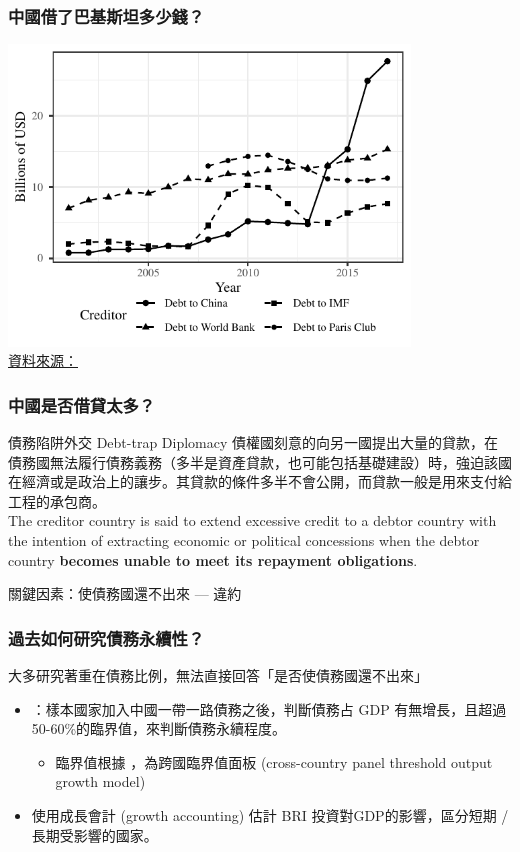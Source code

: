 \documentclass[mathserif]{beamer}
\begin{document}
    \begin{frame}[label = {pak_ts}]
        \frametitle{中國借了巴基斯坦多少錢？}
        \begin{center}
            \includegraphics[width = 0.8\textwidth]{fig/ALL/Pakistan_debt_source.pdf}\\
            \small \hyperlink{pak_ds}{資料來源：}\citet*{Horn-Reinhart-Trebesch-21}
        \end{center}
    \end{frame}

    \begin{frame}
        \frametitle{中國是否借貸太多？}
            \begin{block}{債務陷阱外交 Debt-trap Diplomacy}
               債權國刻意的向另一國提出大量的貸款，在債務國無法履行債務義務（多半是資產貸款，也可能包括基礎建設）時，強迫該國在經濟或是政治上的讓步。其貸款的條件多半不會公開，而貸款一般是用來支付給工程的承包商。\\
               The creditor country is said to extend excessive credit to a debtor country with the intention of extracting economic or political concessions when the debtor country \textbf{becomes unable to meet its repayment obligations}.
            \end{block}
            \pause
            \vfill
            關鍵因素：使債務國還不出來 --- 違約
    \end{frame}

    \begin{frame}
        \frametitle{過去如何研究債務永續性？}
            大多研究著重在債務比例，無法直接回答「是否使債務國還不出來」
            \vfill
            \pause
            \begin{itemize}
            \item \citet{Hurley19-8-debt-trap}：樣本國家加入中國一帶一路債務之後，判斷債務占 GDP 有無增長，且超過50-60\%的臨界值，來判斷債務永續程度。
                \begin{itemize}
                    \item 臨界值根據 \citet{Chudik-15}，為跨國臨界值面板 (cross-country panel threshold output growth model)
                \end{itemize}
            \item \citet{Bandiera-Vasileios-BRI-debt} 使用成長會計 (growth accounting) 估計 BRI 投資對GDP的影響，區分短期 / 長期受影響的國家。
            \end{itemize}
    \end{frame}
\end{document}
